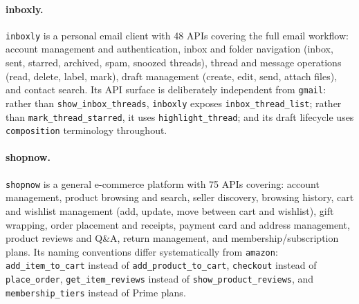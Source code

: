 \documentclass[11pt]{article}
\begin{document}
\paragraph{inboxly.}
\texttt{inboxly} is a personal email client with 48 APIs covering the full email workflow: account management and authentication, inbox and folder navigation (inbox, sent, starred, archived, spam, snoozed threads), thread and message operations (read, delete, label, mark), draft management (create, edit, send, attach files), and contact search. Its API surface is deliberately independent from \texttt{gmail}: rather than \texttt{show\_inbox\_threads}, \texttt{inboxly} exposes \texttt{inbox\_thread\_list}; rather than \texttt{mark\_thread\_starred}, it uses \texttt{highlight\_thread}; and its draft lifecycle uses \texttt{composition} terminology throughout.

\paragraph{shopnow.}
\texttt{shopnow} is a general e-commerce platform with 75 APIs covering: account management, product browsing and search, seller discovery, browsing history, cart and wishlist management (add, update, move between cart and wishlist), gift wrapping, order placement and receipts, payment card and address management, product reviews and Q\&A, return management, and membership/subscription plans. Its naming conventions differ systematically from \texttt{amazon}: \texttt{add\_item\_to\_cart} instead of \texttt{add\_product\_to\_cart}, \texttt{checkout} instead of \texttt{place\_order}, \texttt{get\_item\_reviews} instead of \texttt{show\_product\_reviews}, and \texttt{membership\_tiers} instead of Prime plans.
\end{document}
